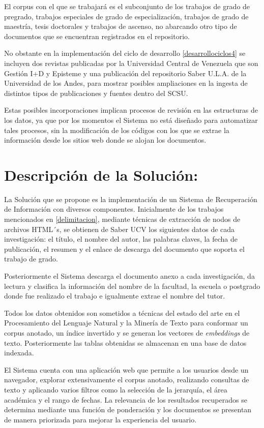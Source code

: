 \documentclass[
  12pt,
  openany]{book}
\begin{document}
El corpus con el que se trabajará es el subconjunto de los trabajos de grado de pregrado, trabajos especiales de grado de especialización, trabajos de grado de maestría, tesis doctorales y trabajos de ascenso, no abarcando otro tipo de documentos que se encuentran registrados en el repositorio.

No obstante en la implementación del ciclo de desarrollo \ref{desarrollociclos4} se incluyen dos revistas publicadas por la Universidad Central de Venezuela que son Gestión I+D y Episteme y una publicación del repositorio Saber U.L.A. de la Universidad de los Andes, para mostrar posibles ampliaciones en la ingesta de distintos tipos de publicaciones y fuentes dentro del SCSU.

Estas posibles incorporaciones implican procesos de revisión en las estructuras de los datos, ya que por los momentos el Sistema no está diseñado para automatizar tales procesos, sin la modificación de los códigos con los que se extrae la información desde los sitios web donde se alojan los documentos.

\hypertarget{descripcion}{%
\section{Descripción de la Solución:}\label{descripcion}}

La Solución que se propone es la implementación de un Sistema de Recuperación de Información con diversos componentes. Inicialmente de los trabajos mencionados en \ref{delimitacion}, mediante técnicas de extracción de nodos de archivos HTML´s, se obtienen de Saber UCV los siguientes datos de cada investigación: el título, el nombre del autor, las palabras claves, la fecha de publicación, el resumen y el enlace de descarga del documento que soporta el trabajo de grado.

Posteriormente el Sistema descarga el documento anexo a cada investigación, da lectura y clasifica la información del nombre de la facultad, la escuela o postgrado donde fue realizado el trabajo e igualmente extrae el nombre del tutor.

Todos los datos obtenidos son sometidos a técnicas del estado del arte en el Procesamiento del Lenguaje Natural y la Minería de Texto para conformar un corpus anotado, un índice invertido y se generan los vectores de \emph{embeddings} de texto. Posteriormente las tablas obtenidas se almacenan en una base de datos indexada.

El Sistema cuenta con una aplicación web que permite a los usuarios desde un navegador, explorar extensivamente el corpus anotado, realizando consultas de texto y aplicando varios filtros como la selección de la jerarquía, el área académica y el rango de fechas. La relevancia de los resultados recuperados se determina mediante una función de ponderación y los documentos se presentan de manera priorizada para mejorar la experiencia del usuario.
\end{document}
